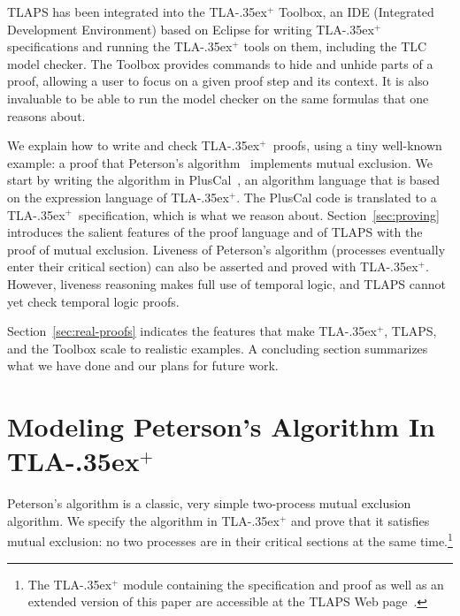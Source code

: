 \documentclass[a4paper,draft]{llncs}
\newcommand{\tlaplus}{\mbox{TLA\kern -.35ex$^+$}\xspace}
\begin{document}
TLAPS has been integrated into the \tlaplus Toolbox, an IDE (Integrated Development
Environment) based on Eclipse for writing \tlaplus specifications and
running the \tlaplus tools on them, including the TLC model checker. The Toolbox
provides commands to hide and unhide parts of a proof, allowing a user to focus
on a given proof step and its context. It is also invaluable to be able to run
the model checker on the same formulas that one reasons about.

We explain how to write and check \tlaplus\ proofs,
using a tiny well-known example: a proof that Peterson's
algorithm~\cite{peterson:myths} implements
mutual exclusion. We start by writing the algorithm in
PlusCal~\cite{lamport:pluscal}, an algorithm language that is based on the
expression language of \tlaplus. The PlusCal code is translated to a \tlaplus\
specification, which is what we reason about. Section~\ref{sec:proving}
introduces the salient features of the proof language and of TLAPS with the
proof of mutual exclusion. Liveness of Peterson's
algorithm (processes eventually enter their critical section) can also be
asserted and proved with \tlaplus. However, liveness reasoning makes full use of
temporal logic, and TLAPS cannot yet check temporal logic proofs.

Section~\ref{sec:real-proofs} indicates the features that make \tlaplus, TLAPS,
and the Toolbox scale to realistic examples. A concluding section summarizes
what we have done and our plans for future work.



\section{Modeling Peterson's Algorithm In \tlaplus}
\label{sec:peterson}

Peterson's algorithm %
is a classic, very simple
two-process mutual exclusion algorithm.  We specify the algorithm in
\tlaplus and prove that it satisfies mutual exclusion: no two
processes are in their critical sections at the same
time.\footnote{The \tlaplus module containing the
  specification and proof as well as an extended version
  of this paper are accessible at the TLAPS Web page~\cite{tlaps}.}

\end{document}
